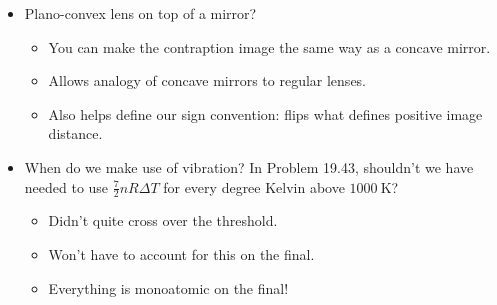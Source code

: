 \documentclass[../notes.tex]{subfiles}
\begin{document}
\begin{itemize}
\begin{itemize}
    \end{itemize}
    \item Plano-convex lens on top of a mirror?
    \begin{itemize}
        \item You can make the contraption image the same way as a concave mirror.
        \item Allows analogy of concave mirrors to regular lenses.
        \item Also helps define our sign convention: flips what defines positive image distance.
    \end{itemize}
    \item When do we make use of vibration? In Problem 19.43, shouldn't we have needed to use $\frac{7}{2}nR\Delta T$ for every degree Kelvin above $\SI{1000}{\kelvin}$?
    \begin{itemize}
        \item Didn't quite cross over the threshold.
        \item Won't have to account for this on the final.
        \item Everything is monoatomic on the final!
    \end{itemize}
\end{itemize}
\end{document}
